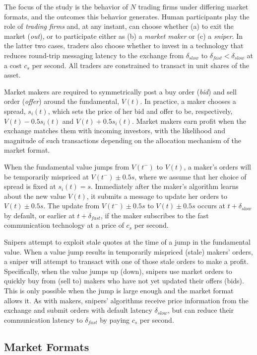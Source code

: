 \documentclass[12pt]{article}
\begin{document}
The focus of the study is the behavior of  $N$ trading firms under differing market formats, and the outcomes this behavior generates. Human participants play the role of \textit{trading firms} and, at any instant, can choose whether (a) to exit the market (\textit{out}), or to participate either as (b) a \textit{market maker} or (c) a \textit{sniper}. In the latter two cases, traders also choose whether to invest in a technology that reduces round-trip messaging latency to the exchange from $\delta_{slow}$ to $\delta_{fast} <\delta_{slow}$ at a cost $c_s$ per second. All traders are constrained to transact in unit shares of the asset.

Market makers are required to symmetrically post a buy order (\textit{bid}) and sell order (\textit{offer}) around the fundamental, $V(t)$. In practice, a maker chooses a spread, $s_i(t)$, which sets the price of her bid and offer to be, respectively, $V(t) - 0.5s_i(t)$ and $V(t) + 0.5s_i(t)$. Market makers earn profit when the exchange matches them with incoming investors, with the likelihood and magnitude of such transactions depending on the allocation mechanism of the market format.

When the fundamental value jumps from $V(t^{-})$ to $V(t)$, a maker's orders will be temporarily mispriced at $V(t^{-}) \pm 0.5 s$, where we assume that her choice of spread is fixed at $s_i(t) = s$. Immediately after the maker's algorithm learns about the new value $V(t)$, it submits a message to update her orders to $V(t) \pm 0.5 s$.  
The update from $V(t^{-}) \pm 0.5 s$ to $V(t) \pm 0.5 s$ occurs at $t + \delta_{slow}$ by default, or earlier at  $t + \delta_{fast}$, if the maker subscribes to the fast communication technology at a price of $c_s$ per second.

Snipers attempt to exploit stale quotes at the time of a jump in the fundamental value. When a value jump results in temporarily mispriced (stale) makers' orders, a sniper will attempt to transact with one of those stale orders to make a profit.
Specifically, when the value jumps up (down), snipers use market orders to quickly buy from (sell to) makers who have not yet updated their offers (bids). This is only possible when the jump is large enough and the market format allows it. As with makers, snipers' algorithms receive price information from the exchange and submit orders with default latency $\delta_{slow}$, but can reduce their communication latency to $\delta_{fast}$ by paying $c_s$ per second.

\subsection{Market Formats \label{Market Formats}}
\end{document}
